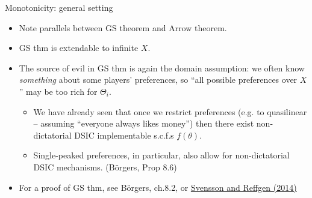 \documentclass[english,10pt
,aspectratio=169
]{beamer}
\begin{document}
\begin{frame}{Monotonicity: general setting}
	\begin{itemize}
		\item Note parallels between GS theorem and Arrow theorem.
		\item GS thm is extendable to infinite $X$.
		\item The source of evil in GS thm is again the domain assumption: we often know \emph{something} about some players' preferences, so ``all possible preferences over $X$'' may be too rich for $\Theta_i$.
		\begin{itemize}
			\item We have already seen that once we restrict preferences (e.g. to quasilinear -- assuming ``everyone always likes money'') then there exist non-dictatorial DSIC implementable s.c.f.s $f(\theta)$.
			\item Single-peaked preferences, in particular, also allow for non-dictatorial DSIC mechanisms. (B{\"o}rgers, Prop 8.6)
		\end{itemize}
		\item For a proof of GS thm, see B{\"o}rgers, ch.8.2, or \href{http://dx.doi.org/10.1016/j.jmateco.2014.09.007}{\uline{Svensson and Reffgen (2014)}}
	\end{itemize}
\end{frame}
\end{document}
